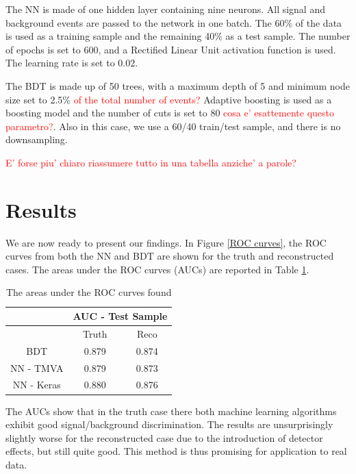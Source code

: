 \documentclass[10pt,a4paper]{book}
\newcommand\todo[1]{\textcolor{red}{#1}}
\begin{document}
The NN is made of one hidden layer containing nine neurons. All signal and background events are passed to the network in one batch. The 60\% of the data is used as a training sample and the remaining 40\% as a test sample. The number of epochs is set to 600, and a Rectified Linear Unit activation function is used. The learning rate is set to 0.02. 

The BDT is made up of 50 trees, with a maximum depth of 5 and minimum node size set to 2.5\% \todo{of the total number of events?} Adaptive boosting is used as a boosting model and the number of cuts is set to 80 \todo{cosa e' esattemente questo parametro?}. Also in this case, we use a 60/40 train/test sample, and there is no downsampling.

\todo{E' forse piu' chiaro riassumere tutto in una tabella anziche' a parole?}

\section{Results}

We are now ready to present our findings. In Figure \ref{ROC curves}, the ROC curves from both the NN and BDT are shown for the truth and reconstructed cases. The areas under the ROC curves (AUCs) are reported in Table \ref{AUC table}.

\begin{table}
\centering
\begin{tabular}{|c|c|c|}
\hline 
\* & \multicolumn{2}{c|}{AUC - Test Sample} \\ 
\hline 
\* & Truth & Reco \\ 
\hline 
BDT & 0.879 & 0.874 \\ 
\hline 
NN - TMVA & 0.879 & 0.873 \\ 
\hline 
NN - Keras & 0.880 & 0.876 \\ 
\hline 
\end{tabular} 
\caption{The areas under the ROC curves found}
\label{AUC table}
\end{table} 

The AUCs show that in the truth case there both machine learning algorithms exhibit good signal/background discrimination. The results are unsurprisingly slightly worse for the reconstructed case due to the introduction of detector effects, but still quite good. This method is thus promising for application to real data.
\end{document}
